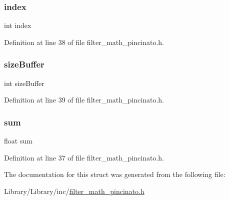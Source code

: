 \mbox{\label{struct_average_filter___a750b5d744c39a06bfb13e6eb010e35d0}} 
\subsubsection{\texorpdfstring{index}{index}}
{\footnotesize\ttfamily int index}



Definition at line 38 of file filter\+\_\+math\+\_\+pincinato.\+h.

\mbox{\label{struct_average_filter___a145948232f729807d798ee4339711815}} 
\subsubsection{\texorpdfstring{size\+Buffer}{sizeBuffer}}
{\footnotesize\ttfamily int size\+Buffer}



Definition at line 39 of file filter\+\_\+math\+\_\+pincinato.\+h.

\mbox{\label{struct_average_filter___aeeafe7e9eebbd2a45ce4fa2ae0d96c51}} 
\subsubsection{\texorpdfstring{sum}{sum}}
{\footnotesize\ttfamily float sum}



Definition at line 37 of file filter\+\_\+math\+\_\+pincinato.\+h.



The documentation for this struct was generated from the following file\+:\begin{DoxyCompactItemize}
\item 
Library/\+Library/inc/\mbox{\hyperlink{filter__math__pincinato_8h}{filter\+\_\+math\+\_\+pincinato.\+h}}\end{DoxyCompactItemize}

